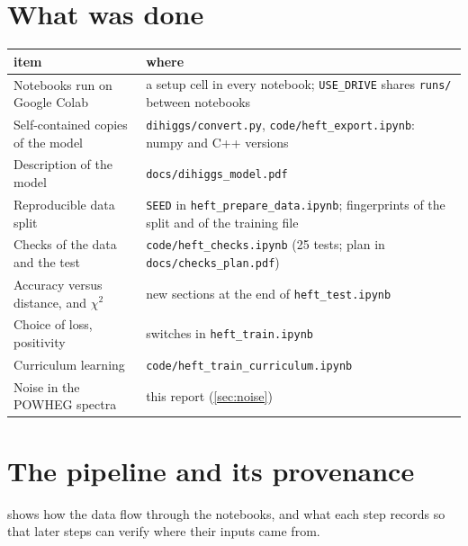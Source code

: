 \documentclass[11pt]{article}
\newcommand{\file}[1]{\nolinkurl{#1}}
\newcommand{\code}[1]{\texttt{#1}}
\begin{document}
\tableofcontents

\section{What was done}
\label{sec:done}

\begin{center}
\small
\begin{tabular}{p{}p{}}
\toprule
item & where\\
\midrule
Notebooks run on Google Colab & a setup cell in every notebook; \code{USE\_DRIVE} shares \file{runs/} between notebooks\\
Self-contained copies of the model & \file{dihiggs/convert.py}, \file{code/heft_export.ipynb}: numpy and C++ versions\\
Description of the model & \file{docs/dihiggs_model.pdf}\\
Reproducible data split & \code{SEED} in \file{heft_prepare_data.ipynb}; fingerprints of the split and of the training file\\
Checks of the data and the test & \file{code/heft_checks.ipynb} (25 tests; plan in \file{docs/checks_plan.pdf})\\
Accuracy versus distance, and $\chi^2$ & new sections at the end of \file{heft_test.ipynb}\\
Choice of loss, positivity & switches in \file{heft_train.ipynb}\\
Curriculum learning & \file{code/heft_train_curriculum.ipynb}\\
Noise in the POWHEG spectra & this report (\cref{sec:noise})\\
\bottomrule
\end{tabular}
\end{center}

\section{The pipeline and its provenance}
\label{sec:pipeline}

 shows how the data flow through the notebooks, and what each
step records so that later steps can verify where their inputs came from.
\end{document}
